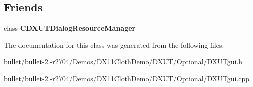 \subsection*{Friends}
\begin{DoxyCompactItemize}
\item 
\hypertarget{class_c_d_x_u_t_dialog_a9f01c7e77f6c0b33ee51859336171041}{class {\bfseries C\+D\+X\+U\+T\+Dialog\+Resource\+Manager}}\label{class_c_d_x_u_t_dialog_a9f01c7e77f6c0b33ee51859336171041}

\end{DoxyCompactItemize}


The documentation for this class was generated from the following files\+:\begin{DoxyCompactItemize}
\item 
bullet/bullet-\/2.-\/r2704/\+Demos/\+D\+X11\+Cloth\+Demo/\+D\+X\+U\+T/\+Optional/D\+X\+U\+Tgui.\+h\item 
bullet/bullet-\/2.-\/r2704/\+Demos/\+D\+X11\+Cloth\+Demo/\+D\+X\+U\+T/\+Optional/D\+X\+U\+Tgui.\+cpp\end{DoxyCompactItemize}
